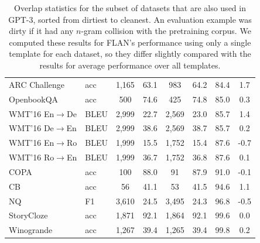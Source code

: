 \begin{table}[h]
\begin{tabular}{ll cc cc cc}
        ARC Challenge         & acc & 1,165  & 63.1 & 983  & 64.2 & 84.4 & 1.7   \\
        OpenbookQA             & acc & 500   & 74.6 & 425  & 74.8 & 85.0 & 0.3   \\
        WMT'16 En$\rightarrow$De & BLEU     & 2,999  & 22.7 & 2,569 & 23.0 & 85.7 & 1.4   \\
        WMT'16 De$\rightarrow$En & BLEU     & 2,999  & 38.6 & 2,569 & 38.7 & 85.7 & 0.2   \\
        WMT'16 En$\rightarrow$Ro & BLEU     & 1,999  & 15.5 & 1,752 & 15.4 & 87.6 & -0.7  \\
        WMT'16 Ro$\rightarrow$En & BLEU     & 1,999  & 36.7 & 1,752 & 36.8 & 87.6 & 0.1   \\
        COPA                   & acc & 100   & 88.0 & 91   & 87.9 & 91.0 & -0.1  \\
        CB                     & acc & 56    & 41.1 & 53   & 41.5 & 94.6 & 1.1   \\
        NQ     & F1       & 3,610  & 24.5 & 3,495 & 24.3 & 96.8 & -0.5  \\
        StoryCloze           & acc & 1,871  & 92.1 & 1,864 & 92.1 & 99.6 & 0.0   \\
        Winogrande             & acc & 1,267  & 39.4 & 1,265 & 39.4 & 99.8 & 0.2   \\
        \bottomrule
        \end{tabular}
    \caption{
    Overlap statistics for the subset of datasets that are also used in GPT-3, sorted from dirtiest to cleanest. 
    An evaluation example was dirty if it had any $n$-gram collision with the pretraining corpus. 
    We computed these results for FLAN's performance using only a single template for each dataset, so they differ slightly compared with the results for average performance over all templates.
    }
    \label{tab:data_contamination}
    \end{table}
\endgroup